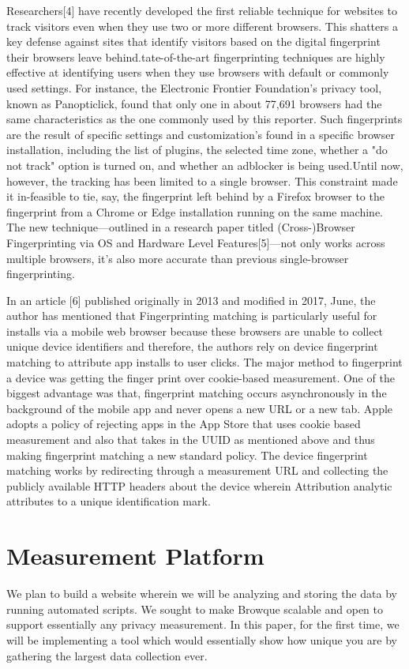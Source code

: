 \documentclass[journal]{IEEEtran}
\begin{document}
Researchers[4] have recently developed the first reliable technique for websites
to track visitors even when they use two or more different browsers. This
shatters a key defense against sites that identify visitors based on the digital
fingerprint their browsers leave behind.tate-of-the-art fingerprinting
techniques are highly effective at identifying users when they use browsers with
default or commonly used settings. For instance, the Electronic Frontier
Foundation's privacy tool, known as Panopticlick, found that only one in about
77,691 browsers had the same characteristics as the one commonly used by this
reporter. Such fingerprints are the result of specific settings and
customization's found in a specific browser installation, including the list of
plugins, the selected time zone, whether a "do not track" option is turned on,
and whether an adblocker is being used.Until now, however, the tracking has been
limited to a single browser. This constraint made it in-feasible to tie, say, the
fingerprint left behind by a Firefox browser to the fingerprint from a Chrome or
Edge installation running on the same machine. The new technique—outlined in a
research paper titled (Cross-)Browser Fingerprinting via OS and Hardware Level
Features[5]—not only works across multiple browsers, it's also more accurate
than previous single-browser fingerprinting.

In an article [6] published originally in 2013 and modified in 2017, June, the author has
mentioned that Fingerprinting matching is particularly useful for installs via a mobile
web browser because these browsers are unable to collect unique device identifiers and
therefore, the authors rely on device fingerprint matching to attribute app installs to
user clicks. The major method to fingerprint a device was getting the finger print over
cookie-based measurement. One of the biggest advantage was that, fingerprint matching
occurs asynchronously in the background of the mobile app and never opens a new URL or a
new tab. Apple adopts a policy of rejecting apps in the App Store that uses cookie based
measurement and also that takes in the UUID as mentioned above and thus making
fingerprint matching a new standard policy. The device fingerprint matching works by
redirecting through a measurement URL and collecting the publicly available HTTP headers
about the device wherein Attribution analytic attributes to a unique identification
mark. 

\section{Measurement Platform}
We plan to build a website wherein we will be analyzing and storing the data by running
automated scripts. We sought to make Browque scalable and open to support essentially any
privacy measurement. In this paper, for the first time, we will be implementing a tool
which would essentially show how unique you are by gathering the largest data collection
ever. 
\end{document}
